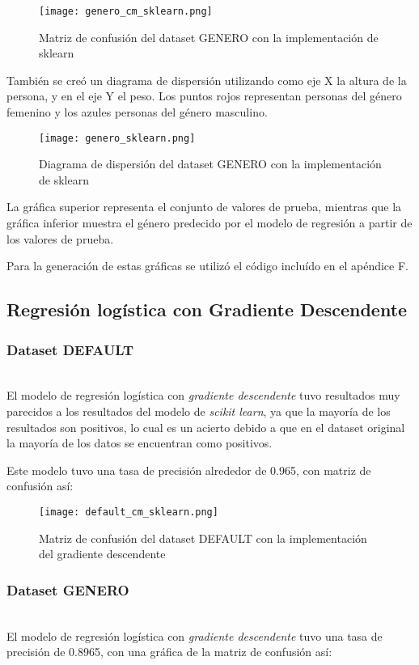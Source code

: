 \documentclass[sigconf,authorversion,nonacm]{acmart}
\begin{document}
\begin{figure}[H]
  \centering
  \texttt{[image: genero\_cm\_sklearn.png]}
  \caption{Matriz de confusión del dataset GENERO con la implementación de sklearn}
\end{figure}

También se creó un diagrama de dispersión utilizando como eje X la altura de la persona, y en el eje Y el peso. Los puntos rojos representan personas del género femenino y los azules personas del género masculino.

\begin{figure}[H]
  \centering
  \texttt{[image: genero\_sklearn.png]}
  \caption{Diagrama de dispersión del dataset GENERO con la implementación de sklearn}
\end{figure}

La gráfica superior representa el conjunto de valores de prueba, mientras que la gráfica inferior muestra el género predecido por el modelo de regresión a partir de los valores de prueba.

Para la generación de estas gráficas se utilizó el código incluído en el apéndice F.

\subsection{Regresión logística con Gradiente Descendente}

\subsubsection{Dataset DEFAULT}\hfill\\
El modelo de regresión logística con \textit{gradiente descendente} tuvo resultados muy parecidos a los resultados del modelo de \textit{scikit learn}, ya que la mayoría de los resultados son positivos, lo cual es un acierto debido a que en el dataset original la mayoría de los datos se encuentran como positivos.

Este modelo tuvo una tasa de precisión alrededor de 0.965, con matriz de confusión así:

\vfill
\pagebreak

\begin{figure}[H]
  \centering
  \texttt{[image: default\_cm\_sklearn.png]}
  \caption{Matriz de confusión del dataset DEFAULT con la implementación del gradiente descendente}
\end{figure}


\subsubsection{Dataset GENERO}\hfill\\
El modelo de regresión logística con \textit{gradiente descendente} tuvo una tasa de precisión de 0.8965, con una gráfica de la matriz de confusión así:
\end{document}
